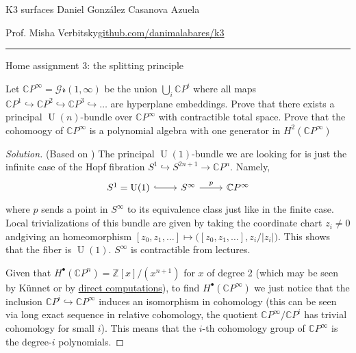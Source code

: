 
\usepackage[style=authortitle-terse,backend=bibtex]{biblatex}


\setcounter{secnumdepth}{0}



\begin{minipage}{\textwidth}
	\begin{minipage}{1\textwidth}
		K3 surfaces \hfill Daniel González Casanova Azuela
		
		{\small Prof. Misha Verbitsky\hfill\href{https://github.com/danimalabares/k3}{github.com/danimalabares/k3}}
	\end{minipage}
\end{minipage}\vspace{.2cm}\hrule

\vspace{10pt}
{\huge Home assignment 3: the splitting principle}

\begin{manualexercise}{3.1}
	Let $\mathbb{C}P^\infty=\mathcal{Gr}(1,\infty)$ be the union $\bigcup_{i} \mathbb{C}P^i$ where all maps $\mathbb{C}P^1\hookrightarrow \mathbb{C}P^2\hookrightarrow \mathbb{C}P^3\hookrightarrow \ldots$ are hyperplane embeddings. Prove that there exists a principal $\operatorname{U}(n) $-bundle over $\mathbb{C}P^\infty$ with contractible total space. Prove that the cohomoogy of $\mathbb{C}P^\infty$ is a polynomial algebra with one generator in $H^{2}(\mathbb{C}P^\infty)$
\end{manualexercise}

\begin{proof}[Solution]\leavevmode
	(Based on \cite{hatvb}) The principal $\operatorname{U}(1)$-bundle we are looking for is just the infinite case of the Hopf fibration $S^1\hookrightarrow S^{2n+1}\to \mathbb{C}P^{n}$. Namely,
\[\begin{tikzcd}
	S^1=\operatorname{U}(1) \arrow[r,hook]& S^\infty\arrow[r,"p"]&\mathbb{C}P^{\infty}
\end{tikzcd}\]
where $p$ sends a point in $S^\infty$ to its equivalence class just like in the finite case. Local trivializations of this bundle are given by taking the coordinate chart $z_i\neq 0$ andgiving an homeomorphism $[z_0,z_1,\ldots ]\mapsto \big( [z_0,z_1,\ldots],z_i/|z_i| \big)$. This shows that the fiber is $\operatorname{U}(1)$. $S^\infty$ is contractible from lectures.

Given that $H^{\bullet}(\mathbb{C}P^n)=\mathbb{Z}[x]/(x^{n+1})$ for $x$ of degree 2 (which may be seen by K\"unnet or by \href{https://github.com/danimalabares/homotopy-theory/blob/main/exercises/exercises.pdf}{direct computations}), to find $H^{\bullet}(\mathbb{C}P^\infty)$ we just notice that the inclusion $\mathbb{C}P^{i}\hookrightarrow \mathbb{C}P^\infty$ induces an isomorphism in cohomology (this can be seen via long exact sequence in relative cohomology, the quotient $\mathbb{C}P^\infty/\mathbb{C}P^{i}$ has trivial cohomology for small $i$). This means that the $i$-th cohomology group of $\mathbb{C}P^\infty$ is the degree-$i$ polynomials.
\end{proof}

